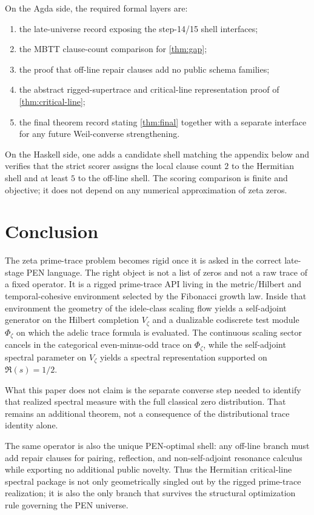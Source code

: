 \documentclass[11pt,a4paper]{article}
\theoremstyle{plain}
\theoremstyle{definition}
\begin{document}
On the Agda side, the required formal layers are:
\begin{enumerate}[nosep]
  \item the late-universe record exposing the step-14/15 shell interfaces;
  \item the MBTT clause-count comparison for \cref{thm:gap};
  \item the proof that off-line repair clauses add no public schema families;
  \item the abstract rigged-supertrace and critical-line representation proof of \cref{thm:critical-line};
  \item the final theorem record stating \cref{thm:final} together with a separate interface for any future Weil-converse strengthening.
\end{enumerate}

On the Haskell side, one adds a candidate shell matching the appendix below and verifies that the strict scorer assigns the local clause count $2$ to the Hermitian shell and at least $5$ to the off-line shell. The scoring comparison is finite and objective; it does not depend on any numerical approximation of zeta zeros.

\section{Conclusion}

The zeta prime-trace problem becomes rigid once it is asked in the correct late-stage PEN language. The right object is not a list of zeros and not a raw trace of a fixed operator. It is a rigged prime-trace API living in the metric/Hilbert and temporal-cohesive environment selected by the Fibonacci growth law. Inside that environment the geometry of the idele-class scaling flow yields a self-adjoint generator on the Hilbert completion $V_{\zeta}$ and a dualizable codiscrete test module $\Phi_{\zeta}$ on which the adelic trace formula is evaluated. The continuous scaling sector cancels in the categorical even-minus-odd trace on $\Phi_{\zeta}$, while the self-adjoint spectral parameter on $V_{\zeta}$ yields a spectral representation supported on $\Re(s)=1/2$.

What this paper does not claim is the separate converse step needed to identify that realized spectral measure with the full classical zero distribution. That remains an additional theorem, not a consequence of the distributional trace identity alone.

The same operator is also the unique PEN-optimal shell: any off-line branch must add repair clauses for pairing, reflection, and non-self-adjoint resonance calculus while exporting no additional public novelty. Thus the Hermitian critical-line spectral package is not only geometrically singled out by the rigged prime-trace realization; it is also the only branch that survives the structural optimization rule governing the PEN universe.
\end{document}

